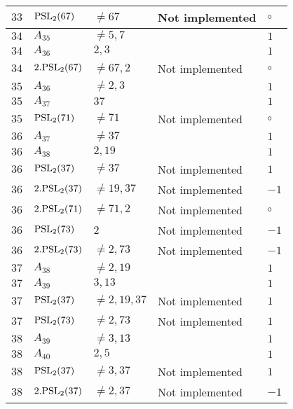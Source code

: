 \documentclass[a4paper, 11pt]{article}
\begin{document}
\begin{longtable}{lllll}
        $ 33 $ & $ {\rm PSL}_{2}(67) $ & $ \neq 67 $ & Not implemented & $\circ$ \\ \hline
        $ 34 $ & $ A_{35} $ & $ \neq 5, 7 $ & $ ~ $ & $ 1  $ \\ \hline
        $ 34 $ & $ A_{36} $ & $ 2, 3 $ & $ ~ $ & $ 1  $ \\ \hline
        $ 34 $ & $ 2.{\rm PSL}_{2}(67) $ & $ \neq 67, 2 $ & Not implemented & $\circ$ \\ \hline
        $ 35 $ & $ A_{36} $ & $ \neq 2, 3 $ & $ ~ $ & $ 1  $ \\ \hline
        $ 35 $ & $ A_{37} $ & $ 37 $ & $ ~ $ & $ 1  $ \\ \hline
        $ 35 $ & $ {\rm PSL}_{2}(71) $ & $ \neq 71 $ & Not implemented & $\circ$ \\ \hline
        $ 36 $ & $ A_{37} $ & $ \neq 37 $ & $ ~ $ & $ 1  $ \\ \hline
        $ 36 $ & $ A_{38} $ & $ 2, 19 $ & $ ~ $ & $ 1  $ \\ \hline
        $ 36 $ & $ {\rm PSL}_{2}(37) $ & $ \neq 37 $ & Not implemented & $ 1  $ \\ \hline
        $ 36 $ & $ 2.{\rm PSL}_{2}(37) $ & $ \neq 19, 37 $ & Not implemented & $ -1  $ \\ \hline
        $ 36 $ & $ 2.{\rm PSL}_{2}(71) $ & $ \neq 71, 2 $ & Not implemented & $\circ$ \\ \hline
        $ 36 $ & $ {\rm PSL}_{2}(73) $ & $ 2 $ & Not implemented & $ -1  $ \\ \hline
        $ 36 $ & $ 2.{\rm PSL}_{2}(73) $ & $ \neq 2, 73 $ & Not implemented & $ -1  $ \\ \hline
        $ 37 $ & $ A_{38} $ & $ \neq 2, 19 $ & $ ~ $ & $ 1  $ \\ \hline
        $ 37 $ & $ A_{39} $ & $ 3, 13 $ & $ ~ $ & $ 1  $ \\ \hline
        $ 37 $ & $ {\rm PSL}_{2}(37) $ & $ \neq 2, 19, 37 $ & Not implemented & $ 1  $ \\ \hline
        $ 37 $ & $ {\rm PSL}_{2}(73) $ & $ \neq 2, 73 $ & Not implemented & $ 1  $ \\ \hline
        $ 38 $ & $ A_{39} $ & $ \neq 3, 13 $ & $ ~ $ & $ 1  $ \\ \hline
        $ 38 $ & $ A_{40} $ & $ 2, 5 $ & $ ~ $ & $ 1  $ \\ \hline
        $ 38 $ & $ {\rm PSL}_{2}(37) $ & $ \neq 3, 37 $ & Not implemented & $ 1  $ \\ \hline
        $ 38 $ & $ 2.{\rm PSL}_{2}(37) $ & $ \neq 2, 37 $ & Not implemented & $ -1  $ \\ \hline

\end{longtable}
\end{document}
